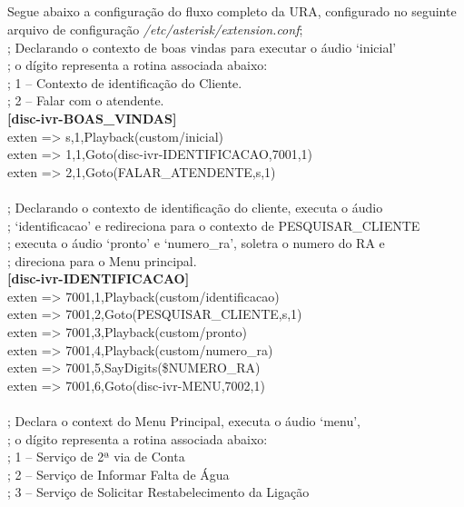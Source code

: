 \begin{apendicesenv}
\chapter{\fontsize{12}{1} }
Segue abaixo a configuração do fluxo completo da URA, configurado no seguinte arquivo de configuração \textit{/etc/asterisk/extension.conf};
\\[8pt]
; Declarando o contexto de boas vindas para executar o áudio ‘inicial’ \\
; o dígito representa a rotina associada abaixo: \\
; 1 – Contexto de identificação do Cliente. \\
; 2 – Falar com o atendente. \\
\textbf{[disc-ivr-BOAS\_VINDAS] }	 \\
exten => s,1,Playback(custom/inicial)  \\
exten => 1,1,Goto(disc-ivr-IDENTIFICACAO,7001,1)  \\
exten => 2,1,Goto(FALAR\_ATENDENTE,s,1)  \\
 \\
; Declarando o contexto de identificação do cliente, executa o áudio  \\
; ‘identificacao’ e redireciona para o contexto de PESQUISAR\_CLIENTE \\
; executa o áudio ‘pronto’ e ‘numero\_ra’, soletra o numero do RA e  \\
; direciona para o Menu principal. \\
\textbf{[disc-ivr-IDENTIFICACAO]} \\
exten => 7001,1,Playback(custom/identificacao) \\
exten => 7001,2,Goto(PESQUISAR\_CLIENTE,s,1) \\
exten => 7001,3,Playback(custom/pronto) \\
exten => 7001,4,Playback(custom/numero\_ra) \\
exten => 7001,5,SayDigits(\${NUMERO\_RA}) \\
exten => 7001,6,Goto(disc-ivr-MENU,7002,1) \\
 \\
; Declara o context do Menu Principal, executa o áudio ‘menu’, \\
; o dígito representa a rotina associada abaixo: \\
; 1 – Serviço de 2ª via de Conta \\
; 2 – Serviço de Informar Falta de Água \\
; 3 – Serviço de Solicitar Restabelecimento da Ligação \\

\end{apendicesenv}
